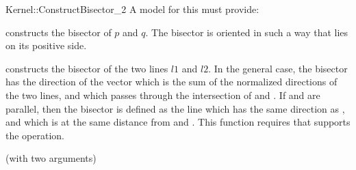 \begin{ccRefFunctionObjectConcept}{Kernel::ConstructBisector_2}
A model for this must provide:


{constructs the bisector of $p$ and $q$.
The bisector is oriented in such a way that  lies on its
positive side. }

{constructs the bisector of the two lines $l1$ and $l2$.
In the general case, the bisector has the direction of the vector which
is the sum of the normalized directions of the two lines, and which passes
through the intersection of  and .
If  and  are parallel, then the bisector is defined as the line
which has the same direction as , and which is at the same distance
from  and .
This function requires that  supports the 
operation.}

\ccRefines
{} (with two arguments)

\ccSeeAlso
{}

\end{ccRefFunctionObjectConcept}
